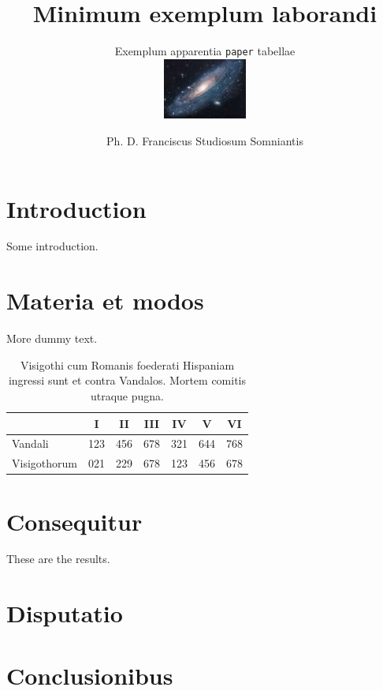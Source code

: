 \documentclass[a4paper,latin]{paper}
\title{Minimum exemplum laborandi}
\subtitle{Exemplum apparentia \texttt{paper} tabellae\\
\hfill\includegraphics[height=2cm]{../02_Immagini/img_src/universe.jpg}
\vspace{-2cm}}
\author{Ph. D. Franciscus Studiosum Somniantis}
\begin{document}
 


\section{Introduction} 
Some introduction. \lipsum[2]
\section{Materia et modos} 
More dummy text. \lipsum[4] 

\begin{table}[b]
\centering
\begin{tabular}{lcccccc}
\toprule
& I &  II & III & IV & V & VI \\
\midrule
Vandali     & 123 & 456 & 678 & 321 & 644 & 768  \\ 
Visigothorum & 021 & 229 & 678 & 123 & 456 & 678 \\     
\bottomrule
\end{tabular}
\caption{Visigothi cum Romanis foederati Hispaniam ingressi sunt et contra Vandalos. Mortem comitis utraque pugna.} 
\end{table}

\section{Consequitur} 
These are the results. \lipsum[1]
\section{Disputatio} 
\lipsum[4] 
\section{Conclusionibus}
\lipsum[5]
\end{document}

